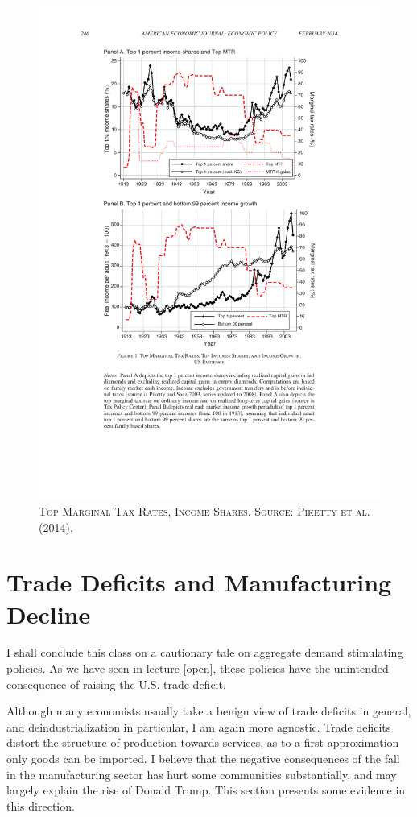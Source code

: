 \documentclass[]{book}
\begin{document}
\begin{figure}

{\centering \includegraphics[width=0.8\linewidth,height=0.8\textheight]{figures/PikettySaezStantcheva2014/fig1a} 

}

\caption{\textsc{Top Marginal Tax Rates,
Income Shares. Source: Piketty et al. (2014).}}\label{fig:PikettySaezStantcheva2014-fig1a}
\end{figure}

\section{Trade Deficits and Manufacturing
Decline}\label{conclusion-trade-deficits}

I shall conclude this class on a cautionary tale on aggregate demand
stimulating policies. As we have seen in lecture \ref{open}, these
policies have the unintended consequence of raising the U.S. trade
deficit.

Although many economists usually take a benign view of trade deficits in
general, and deindustrialization in particular, I am again more
agnostic. Trade deficits distort the structure of production towards
services, as to a first approximation only goods can be imported. I
believe that the negative consequences of the fall in the manufacturing
sector has hurt some communities substantially, and may largely explain
the rise of Donald Trump. This section presents some evidence in this
direction.
\end{document}
